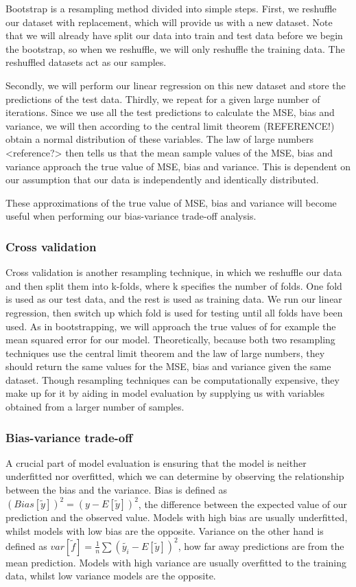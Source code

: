 \documentclass[twocolumn,10pt,cleanfoot]{asme2ej}
\begin{document}
Bootstrap is a resampling method divided into simple steps. First, we reshuffle our dataset with replacement, which will provide us with a new dataset. Note that we will already have split our data into train and test data before we begin the bootstrap, so when we reshuffle, we will only reshuffle the training data. The reshuffled datasets act as our samples.

Secondly, we will perform our linear regression on this new dataset and store the predictions of the test data. Thirdly, we repeat for a given large number of iterations. Since we use all the test predictions to calculate the MSE, bias and variance, we will then according to the central limit theorem (REFERENCE!) obtain a normal distribution of these variables. The law of large numbers <reference?> then tells us that the mean sample values of the MSE, bias and variance approach the true value of MSE, bias and variance. This is dependent on our assumption that our data is independently and identically distributed.

These approximations of the true value of MSE, bias and variance will become useful when performing our bias-variance trade-off analysis.


\subsubsection{Cross validation}

Cross validation is another resampling technique, in which we reshuffle our data and then split them into k-folds, where k specifies the number of folds. One fold is used as our test data, and the rest is used as training data. We run our linear regression, then switch up which fold is used for testing until all folds have been used. As in bootstrapping, we will approach the true values of for example the mean squared error for our model. 
Theoretically, because both two resampling techniques use the central limit theorem and the law of large numbers, they should return the same values for the MSE, bias and variance given the same dataset. Though resampling techniques can be computationally expensive, they make up for it by aiding in model evaluation by supplying us with variables obtained from a larger number of samples. 

\subsubsection{Bias-variance trade-off}

A crucial part of model evaluation is ensuring that the model is neither underfitted nor overfitted, which we can determine by observing the relationship between the bias and the variance. Bias is defined as $(Bias[\tilde{y}])^2 = (y-E[\tilde{y}])^2$, the difference between the expected value of our prediction and the observed value. Models with high bias are usually underfitted, whilst models with low bias are the opposite. Variance on the other hand is defined as $var[\tilde{f}] = \frac{1}{n}\sum(\tilde{y_i}-E[\tilde{y}])^2$, how far away predictions are from the mean prediction. Models with high variance are usually overfitted to the training data, whilst low variance models are the opposite.
\end{document}
